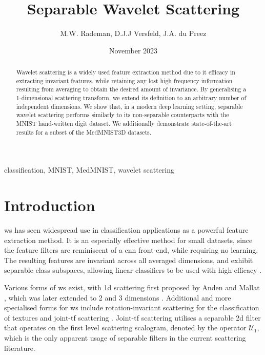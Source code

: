 \documentclass[journal]{IEEEtran}
\title{Separable Wavelet Scattering}
\author{M.W. Rademan, D.J.J Versfeld, J.A. du Preez }
\date{November 2023}
\begin{document}
\maketitle

\begin{abstract}
Wavelet scattering is a widely used feature extraction method due to it efficacy in extracting invariant features, while retaining any lost high frequency information resulting from averaging to obtain the desired amount of invariance. By generalising a 1-dimensional scattering transform, we extend its definition to an arbitrary number of independent dimensions. We show that, in a modern deep learning setting, separable wavelet scattering performs similarly to its non-separable counterparts with the MNIST hand-written digit dataset. We additionally demonstrate state-of-the-art results for a subset of the MedMNIST3D datasets.
\end{abstract}

\begin{IEEEkeywords}
classification, MNIST, MedMNIST, wavelet scattering
\end{IEEEkeywords}

\section{Introduction}
\Ac{ws} has seen widespread use in classification applications as a powerful feature extraction method. It is an especially effective method for small datasets, since the feature filters are reminiscent of a \ac{cnn} front-end, while requiring no learning. The resulting features are invariant across all averaged dimensions, and exhibit separable class subspaces, allowing linear classifiers to be used with high efficacy \cite{2dscattering}.

Various forms of \ac{ws} exist, with \ac{1d} scattering first proposed by Anden and Mallat \cite{1dscattering1, ws}, which was later extended to 2 \cite{2dscattering} and 3 dimensions \cite{3dscattering, harmonicscattering}. Additional and more specialised forms for \ac{ws} include rotation-invariant scattering \cite{groupinvariantscattering} for the classification of textures and joint-\ac{tf} scattering \cite{ws_joint_tf, jointtfscattering2}. Joint-\ac{tf} scattering utilises a separable \ac{2d} filter that operates on the first level scattering scalogram, denoted by the operator $\mathcal{U}_1$, which is the only apparent usage of separable filters in the current scattering literature. 
\end{document}
